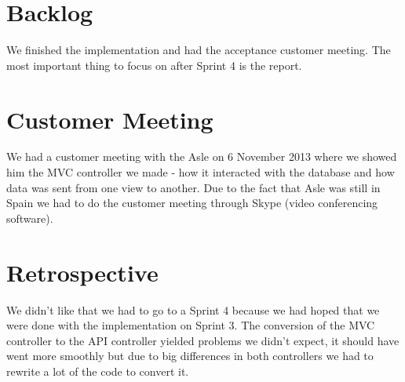\section{Backlog}
We finished the implementation and had the acceptance customer meeting.
The most important thing to focus on after Sprint 4 is the report.


\section{Customer Meeting}
We had a customer meeting with the Asle on 6 November 2013 where we showed him the MVC controller we made - how it interacted with the database and how data was sent from one view to another. Due to the fact that Asle was still in Spain we had to do the customer meeting through Skype (video conferencing software).

\section{Retrospective}
We didn't like that we had to go to a Sprint 4 because we had hoped that we were done with the implementation on Sprint 3. The conversion of the MVC controller to the API controller yielded problems we didn't expect, it should have went more smoothly but due to big differences in both controllers we had to rewrite a lot of the code to convert it. 